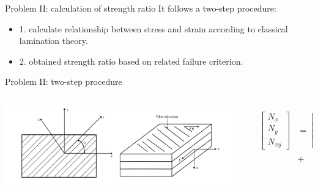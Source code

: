 \documentclass{beamer}
\begin{document}
\begin{frame}{Problem II: calculation of strength ratio}
	It follows a two-step procedure: 
	\begin{itemize}
		\item 1. calculate relationship between stress and strain according to
			classical lamination theory.
		\item 2. obtained strength ratio based on related failure criterion.
	\end{itemize}
\end{frame}

\begin{frame}{Problem II: two-step procedure}
    \begin{columns}[c]
    \begin{column}{0.5\textwidth}
		\includegraphics[width=1.5\linewidth]{./fig/lamina_local_global_axes.png}
    \end{column}
	\begin{column}{0.5\textwidth}
		\begin{equation} \label{eq:force_and_moments}
			\begin{array}{l}
				\begin{aligned}
			\begin{bmatrix}
				N_x \\
				N_y \\
				N_{xy}
			\end{bmatrix}
			&=
			\begin{bmatrix}
				A_{11} & A_{12} & A_{16} \\
				A_{12} & A_{22} & A_{26} \\
				A_{16} & A_{26} & A_{66} 
			\end{bmatrix}
			\begin{bmatrix}
				\varepsilon_x^0 \\
				\varepsilon_y^0 \\
				\gamma_{xy}^0
			\end{bmatrix}   \\
			&+               

\end{aligned}
\end{array}
\end{equation}
\end{column}
\end{columns}
\end{frame}
\end{document}
